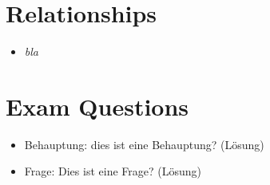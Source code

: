\section{Relationships}
\begin{itemize}
	\item \textit{bla} 
\end{itemize}

\section{Exam Questions}
\begin{itemize}
  \item Behauptung: dies ist eine Behauptung? (Lösung)
    \item Frage: Dies ist eine Frage? (Lösung)
\end{itemize}
